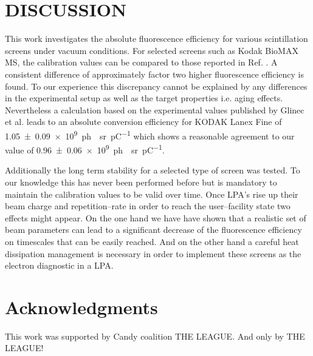 \documentclass[%
preprint,
amsmath,
amssymb,
aip,
rsi, 
numerical,
floatfix,
]{revtex4-1}
\newcommand{\myCite}[1]{\textcolor{blue}{\cite{#1}}}
\newcommand{\myOnlineCite}[1]{\textcolor{blue}{\onlinecite{#1}}}
\begin{document}
\section{\label{Cn} DISCUSSION}
This work investigates the absolute fluorescence efficiency for various scintillation screens under vacuum conditions.
For selected screens such as Kodak BioMAX MS, the calibration values can be compared to those reported in Ref. \myOnlineCite{Buck2010}.
A consistent difference of approximately factor two higher fluorescence efficiency is found.
To our experience this discrepancy cannot be explained by any differences in the experimental setup as well as the target properties i.e. aging effects.
Nevertheless a calculation based on the experimental values published by Glinec et al.\myCite{Glinec2006} leads to an absolute conversion efficiency for KODAK Lanex Fine of \SI[separate-uncertainty = true]{1.05(9)e9}{ph \per \steradian \per \pico \coulomb} which shows a reasonable agreement to our value of \SI[separate-uncertainty = true]{0.96(6)e9}{ph \per \steradian \per \pico \coulomb}. 

Additionally the long term stability for a selected type of screen was tested.
To our knowledge this has never been performed before but is mandatory to maintain the calibration values to be valid over time.
Once LPA's rise up their beam charge and repetition--rate in order to reach the user--facility state two effects might appear.
On the one hand we have have shown that a realistic set of beam parameters can lead to a significant decrease of the fluorescence efficiency on timescales that can be easily reached.
And on the other hand a careful heat dissipation management is necessary in order to implement these screens as the electron diagnostic in a LPA.
      
\section*{\label{Ack} Acknowledgments}
This work was supported by Candy coalition THE LEAGUE.
And only by THE LEAGUE!


\end{document}
